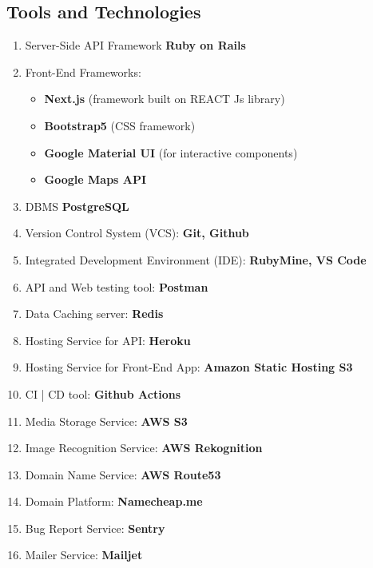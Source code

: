 \subsection{Tools and Technologies}
\begin{enumerate}
	\item Server-Side API Framework \textbf{Ruby on Rails}
	\item Front-End Frameworks:
	\begin{itemize}
		\item \textbf{Next.js} (framework built on REACT Js library)
		\item \textbf{Bootstrap5} (CSS framework)
		\item \textbf{Google Material UI} (for interactive components)
		\item \textbf{Google Maps API}
	\end{itemize}
	\item DBMS \textbf{PostgreSQL}
	\item Version Control System (VCS): \textbf{Git, Github}
	\item Integrated Development Environment (IDE): \textbf{RubyMine, VS Code}
	\item API and Web testing tool: \textbf{Postman}
	\item Data Caching server: \textbf{Redis}
	\item Hosting Service for API: \textbf{Heroku}
	\item Hosting Service for Front-End App: \textbf{Amazon Static Hosting S3}
	\item CI | CD tool: \textbf{Github Actions}
	\item Media Storage Service: \textbf{AWS S3}
	\item Image Recognition Service: \textbf{AWS Rekognition}
	\item Domain Name Service: \textbf{AWS Route53}
	\item Domain Platform: \textbf{Namecheap.me}
	\item Bug Report Service: \textbf{Sentry}
	\item Mailer Service: \textbf{Mailjet}
	
\end{enumerate}

